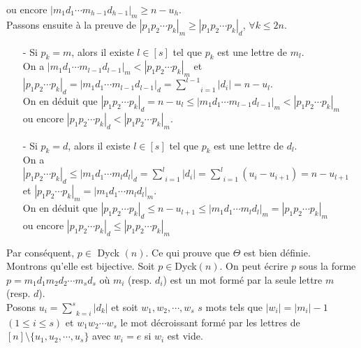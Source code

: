 ou encore $| m_{1}d_{1}\cdots m_{h-1}d_{h-1} |_{m}\geq n-u_{h}$.\\
Passons ensuite à la preuve de $|p_{1}p_{2}\cdots p_{k}|_{m}\geq |p_{1}p_{2}\cdots p_{k}|_{d}$, $\forall k\leq 2n$.
\begin{itemize}
	\item [-] Si $p_{k}=m$, alors il existe $l\in [s]$ tel que $p_{k}$ est une lettre de $m_{l}$.\\ On a $|m_{1}d_{1}\cdots m_{l-1}d_{l-1}|_{m}<|p_{1}p_{2}\cdots p_{k}|_{m}$ et\\ $|p_{1}p_{2}\cdots p_{k}|_{d}=|m_{1}d_{1}\cdots m_{l-1}d_{l-1}|_{d}=\underset{i=1}{\overset{l-1}{\sum}}|d_{i}|=n-u_{l}$.\\
	      On en déduit que $|p_{1}p_{2}\cdots p_{k}|_{d}=n-u_{l}\leq | m_{1}d_{1}\cdots m_{l-1}d_{l-1} |_{m} <|p_{1}p_{2}\cdots p_{k}|_{m}$ \\ ou encore $|p_{1}p_{2}\cdots p_{k}|_{d}<|p_{1}p_{2}\cdots p_{k}|_{m}$.

	\item [-] Si $p_{k}=d$, alors il existe $l\in[s]$ tel que $p_{k}$ est une lettre de $d_{l}$.\\ On a $|p_{1}p_{2}\cdots p_{k}|_{d}\leq |m_{1}d_{1}\cdots m_{l}d_{l}|_{d}=\underset{i=1}{\overset{l}{\sum}}|d_{i}|= \underset{i=1}{\overset{l}{\sum}}(u_{i}-u_{i+1})=n-u_{l+1}$ et $|p_{1}p_{2}\cdots p_{k}|_{m}=|m_{1}d_{1}\cdots m_{l}d_{l}|_{m}$.\\
	      On en déduit que $|p_{1}p_{2}\cdots p_{k}|_{d}\leq n-u_{l+1} \leq |m_{1}d_{1}\cdots m_{l}d_{l}|_{m} =|p_{1}p_{2}\cdots p_{k}|_{m}$ \\ou encore $|p_{1}p_{2}\cdots p_{k}|_{d} \leq|p_{1}p_{2}\cdots p_{k}|_{m}$\vspace{7pt}
\end{itemize}
Par conséquent, $p\in $\rm{ Dyck }$(n)$. Ce qui prouve que $\Theta$ est bien définie.\vspace{10pt}\\
Montrons qu'elle est bijective. Soit $p\in $\rm{Dyck}$(n)$. On peut écrire $p$ sous la forme\\ $p=m_{1}d_{1}m_{2}d_{2}\cdots m_{s}d_{s}$ où $m_{i}$ (resp. $d_{i}$) est un mot formé par la seule lettre $m$ (resp. $d$).\\
Posons $u_{i}=\underset{k=i}{\overset{s}{\sum}}|d_{k}|$ et soit $w_{1}, w_{2}, \cdots, w_{s}$ $s$ mots tels que $|w_{i}| = |m_{i}| - 1$ $(1\leq i \leq s)$ et $w_{1}w_{2}\cdots w_{s}$ le mot décroissant formé par les lettres de $[n]\setminus \{u_1, u_{2}, \cdots, u_{s}\}$ avec $w_i = e$ si $w_i$ est vide.\\
